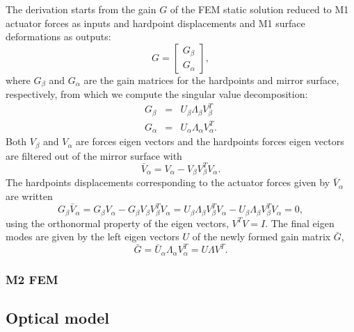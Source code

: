 \documentclass{gmto}
\begin{document}
The derivation starts from the gain $G$ of the FEM static solution reduced to M1
actuator forces as inputs and hardpoint displacements and M1 surface
deformations as outputs:
\begin{equation}
  \label{eq:9}
  G = \begin{bmatrix}
    G_\beta \\ G_\alpha
  \end{bmatrix},
\end{equation}
where $G_\beta$ and $G_\alpha$ are the gain matrices for the hardpoints and
mirror surface, respectively, from which we compute the singular value
decomposition:
\begin{eqnarray}
  \label{eq:10}
  G_\beta &=& U_\beta\Lambda_\beta V_\beta^T \\
  G_\alpha &=& U_\alpha\Lambda_\alpha V_\alpha^T .
\end{eqnarray}
Both $V_\beta$ and $V_\alpha$ are forces eigen vectors and the hardpoints forces
eigen vectors are filtered out of the mirror surface with
\begin{equation}
  \label{eq:11}
  \bar V_\alpha = V_\alpha - V_\beta V_\beta^T  V_\alpha.
\end{equation}
The hardpoints displacements corresponding to the actuator forces given by $\bar
V_\alpha$ are written
\begin{equation}
  \label{eq:12}
  G_\beta \bar V_\alpha = G_\beta  V_\alpha - G_\beta V_\beta V_\beta^T  V_\alpha = U_\beta\Lambda_\beta V_\beta^T V_\alpha - U_\beta\Lambda_\beta V_\beta^T V_\alpha =0,
\end{equation}
using the orthonormal property of the eigen vectors, $V^TV=I$.
The final eigen modes are given by the left eigen vectors $U$ of the newly
formed gain matrix $\bar G$,
\begin{equation}
  \label{eq:13}
  \bar G = \bar U_\alpha\Lambda_\alpha V_\alpha^T = U\Lambda V^T.
\end{equation}

\subsubsection{M2 FEM}
\label{sec:m2-fem}


\clearpage
\subsection{Optical model}
\label{sec:optics}

\cite{GMTO.OpticalDesign}
\end{document}
